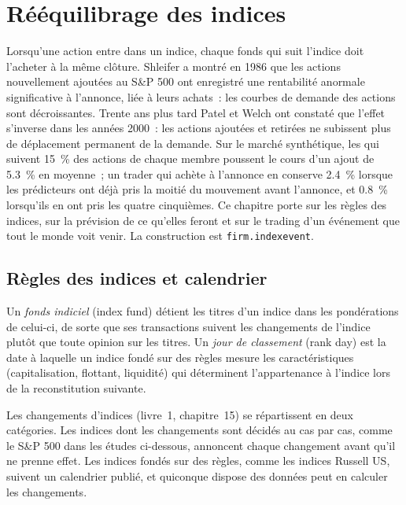 \chapter{Rééquilibrage des indices}\label{ch:s1:index-rebalancing}

Lorsqu'une action entre dans un indice, chaque fonds qui suit l'indice doit l'acheter à la même clôture. Shleifer a montré en 1986 que les actions nouvellement ajoutées au S\&P 500
ont enregistré une rentabilité anormale significative à l'annonce, liée à leurs achats~: les courbes de demande des actions sont décroissantes. Trente ans plus tard
Patel et Welch ont constaté que l'effet s'inverse dans les années 2000~: les actions ajoutées et retirées ne subissent plus de déplacement permanent de la demande. Sur le marché synthétique, les 
qui suivent 15~\% des actions de chaque membre poussent le cours d'un ajout de 5.3~\% en moyenne~; un trader qui achète à l'annonce en conserve 2.4~\% lorsque les prédicteurs
ont déjà pris la moitié du mouvement avant l'annonce, et 0.8~\% lorsqu'ils en ont pris les quatre cinquièmes. Ce chapitre porte sur les règles des indices, sur la prévision de ce
qu'elles feront et sur le trading d'un événement que tout le monde voit venir. La construction est \texttt{firm.indexevent}.

\section{Règles des indices et calendrier}

\begin{definition}\label{def:s1:index-rebalancing:fund}
Un \emph{fonds indiciel} (index fund) détient les titres d'un indice dans les pondérations de celui-ci, de sorte que ses transactions suivent les changements de l'indice plutôt que
toute opinion sur les titres. Un \emph{jour de classement} (rank day) est la date à laquelle un indice fondé sur des règles mesure les caractéristiques (capitalisation, flottant,
liquidité) qui déterminent l'appartenance à l'indice lors de la reconstitution suivante.
\end{definition}

Les changements d'indices (livre~1, chapitre~15) se répartissent en deux catégories. Les indices dont les changements sont décidés au cas par cas, comme le S\&P 500 dans les études ci-dessous, annoncent chaque changement avant qu'il ne prenne
effet.
Les indices fondés sur des règles, comme les indices Russell US, suivent un calendrier publié, et quiconque dispose des données peut en calculer les changements.

